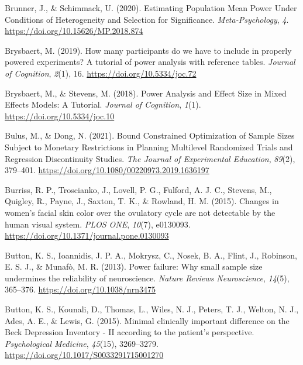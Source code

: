\documentclass[
  letterpaper,
  DIV=11,
  numbers=noendperiod]{scrreprt}
\newlength{\cslhangindent}
\newlength{\cslentryspacingunit} %
\newenvironment{CSLReferences}[2] %
 {%
  \setlength{\parindent}{0pt}
  \ifodd #1
  \let\oldpar\par
  \def\par{\hangindent=\cslhangindent\oldpar}
  \fi
  \setlength{\parskip}{#2\cslentryspacingunit}
 }%
 {}
\begin{document}
\begin{CSLReferences}{1}{0}
\leavevmode{}%
Brunner, J., \& Schimmack, U. (2020). Estimating {Population Mean Power
Under Conditions} of {Heterogeneity} and {Selection} for {Significance}.
\emph{Meta-Psychology}, \emph{4}.
\url{https://doi.org/10.15626/MP.2018.874}

\leavevmode{}%
Brysbaert, M. (2019). How many participants do we have to include in
properly powered experiments? {A} tutorial of power analysis with
reference tables. \emph{Journal of Cognition}, \emph{2}(1), 16.
\url{https://doi.org/10.5334/joc.72}

\leavevmode{}%
Brysbaert, M., \& Stevens, M. (2018). Power {Analysis} and {Effect Size}
in {Mixed Effects Models}: {A Tutorial}. \emph{Journal of Cognition},
\emph{1}(1). \url{https://doi.org/10.5334/joc.10}

\leavevmode{}%
Bulus, M., \& Dong, N. (2021). Bound {Constrained Optimization} of
{Sample Sizes Subject} to {Monetary Restrictions} in {Planning
Multilevel Randomized Trials} and {Regression Discontinuity Studies}.
\emph{The Journal of Experimental Education}, \emph{89}(2), 379--401.
\url{https://doi.org/10.1080/00220973.2019.1636197}

\leavevmode{}%
Burriss, R. P., Troscianko, J., Lovell, P. G., Fulford, A. J. C.,
Stevens, M., Quigley, R., Payne, J., Saxton, T. K., \& Rowland, H. M.
(2015). Changes in women's facial skin color over the ovulatory cycle
are not detectable by the human visual system. \emph{PLOS ONE},
\emph{10}(7), e0130093.
\url{https://doi.org/10.1371/journal.pone.0130093}

\leavevmode{}%
Button, K. S., Ioannidis, J. P. A., Mokrysz, C., Nosek, B. A., Flint,
J., Robinson, E. S. J., \& Munafò, M. R. (2013). Power failure: Why
small sample size undermines the reliability of neuroscience.
\emph{Nature Reviews Neuroscience}, \emph{14}(5), 365--376.
\url{https://doi.org/10.1038/nrn3475}

\leavevmode{}%
Button, K. S., Kounali, D., Thomas, L., Wiles, N. J., Peters, T. J.,
Welton, N. J., Ades, A. E., \& Lewis, G. (2015). Minimal clinically
important difference on the {Beck Depression Inventory} - {II} according
to the patient's perspective. \emph{Psychological Medicine},
\emph{45}(15), 3269--3279.
\url{https://doi.org/10.1017/S0033291715001270}


\end{CSLReferences}
\end{document}
